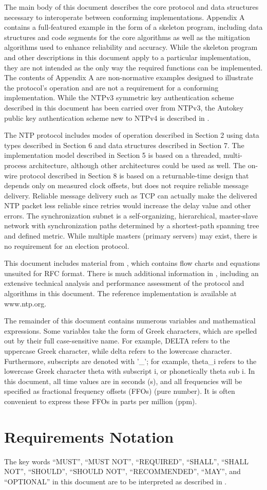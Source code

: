 The main body of this document describes the core protocol and data
structures necessary to interoperate between conforming
implementations. Appendix A contains a full-featured example in the
form of a skeleton program, including data structures and code
segments for the core algorithms as well as the mitigation algorithms
used to enhance reliability and accuracy. While the skeleton program
and other descriptions in this document apply to a particular
implementation, they are not intended as the only way the required
functions can be implemented. The contents of Appendix A are non-normative
examples designed to illustrate the protocol’s operation
and are not a requirement for a conforming implementation. While the
NTPv3 symmetric key authentication scheme described in this document
has been carried over from NTPv3, the Autokey public key
authentication scheme new to NTPv4 is described in \cite{RFC5906}.

The NTP protocol includes modes of operation described in Section 2
using data types described in Section 6 and data structures described
in Section 7. The implementation model described in Section 5 is
based on a threaded, multi-process architecture, although other
architectures could be used as well. The on-wire protocol described
in Section 8 is based on a returnable-time design that depends only
on measured clock offsets, but does not require reliable message
delivery. Reliable message delivery such as TCP \cite{RFC0793} can
actually make the delivered NTP packet less reliable since retries
would increase the delay value and other errors. The synchronization
subnet is a self-organizing, hierarchical, master-slave network with
synchronization paths determined by a shortest-path spanning tree and
defined metric. While multiple masters (primary servers) may exist,
there is no requirement for an election protocol.

This document includes material from \cite{ref9}, which contains flow
charts and equations unsuited for RFC format. There is much
additional information in \cite{ref7}, including an extensive technical
analysis and performance assessment of the protocol and algorithms in
this document. The reference implementation is available at
www.ntp.org.

The remainder of this document contains numerous variables and
mathematical expressions. Some variables take the form of Greek
characters, which are spelled out by their full case-sensitive name.
For example, DELTA refers to the uppercase Greek character, while
delta refers to the lowercase character. Furthermore, subscripts are
denoted with ’\_’; for example, theta\_i refers to the lowercase Greek
character theta with subscript i, or phonetically theta sub i. In
this document, all time values are in seconds (s), and all
frequencies will be specified as fractional frequency offsets (FFOs)
(pure number). It is often convenient to express these FFOs in parts
per million (ppm).

\section{Requirements Notation}

The key words ``MUST'', ``MUST NOT'', ``REQUIRED'', ``SHALL'', ``SHALL NOT'',
``SHOULD'', ``SHOULD NOT'', ``RECOMMENDED'', ``MAY'', and ``OPTIONAL'' in this
document are to be interpreted as described in \cite{RFC2119}.

